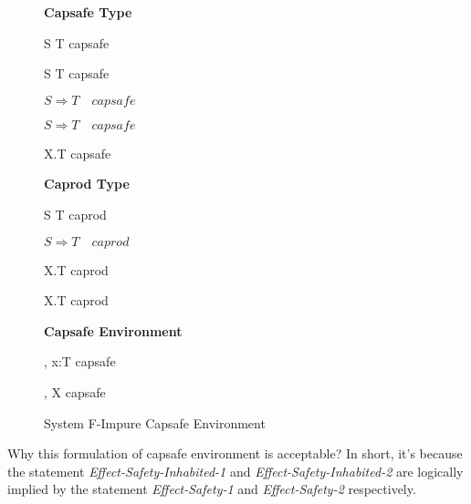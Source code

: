 \begin{figure}[h]
\begin{framed}

\setlength{\columnseprule}{0.4pt}
\begin{multicols}{2}

\textbf{Capsafe Type}


{ S \to T \quad capsafe }

{ S \to T \quad capsafe }

{ \colorbox{shade}{$S \Rightarrow T \quad capsafe$} }

{ \colorbox{shade}{$S \Rightarrow T \quad capsafe$} }

{ \forall X.T \quad capsafe }

\columnbreak

\textbf{Caprod Type}


{ S \to T \quad caprod }

{ \colorbox{shade}{$S \Rightarrow T \quad caprod$} }

{ \forall X.T \quad caprod }

{ \forall X.T \quad caprod }

\textbf{Capsafe Environment}


{ \Gamma, \; x:T \quad capsafe }

{ \Gamma, \; X \quad capsafe }

\end{multicols}
\end{framed}

\caption{System F-Impure Capsafe Environment}
\label{fig:f-impure-capsafe-definition}
\end{figure}

Why this formulation of capsafe environment is acceptable? In short,
it's because the statement \emph{Effect-Safety-Inhabited-1} and
\emph{Effect-Safety-Inhabited-2} are logically implied by the
statement \emph{Effect-Safety-1} and \emph{Effect-Safety-2}
respectively.

